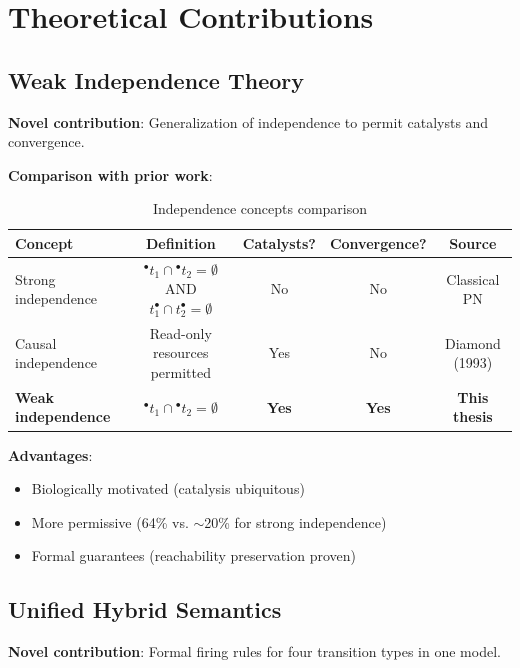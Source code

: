 \section{Theoretical Contributions}
\label{sec:theory-contrib}

\subsection{Weak Independence Theory}
\label{subsec:weak-indep-theory}

\textbf{Novel contribution}: Generalization of independence to permit catalysts and convergence.

\textbf{Comparison with prior work}:

\begin{table}[h]
\centering
\begin{tabular}{@{}lcccc@{}}
\toprule
\textbf{Concept} & \textbf{Definition} & \textbf{Catalysts?} & \textbf{Convergence?} & \textbf{Source} \\
\midrule
Strong independence & ${}^\bullet t_1 \cap {}^\bullet t_2 = \emptyset$ AND $t_1^\bullet \cap t_2^\bullet = \emptyset$ & No & No & Classical PN \\
Causal independence & Read-only resources permitted & Yes & No & Diamond (1993) \\
\textbf{Weak independence} & ${}^\bullet t_1 \cap {}^\bullet t_2 = \emptyset$ & \textbf{Yes} & \textbf{Yes} & \textbf{This thesis} \\
\bottomrule
\end{tabular}
\caption{Independence concepts comparison}
\label{tab:independence-comparison}
\end{table}

\textbf{Advantages}:
\begin{itemize}
    \item Biologically motivated (catalysis ubiquitous)
    \item More permissive (64\% vs. $\sim$20\% for strong independence)
    \item Formal guarantees (reachability preservation proven)
\end{itemize}

\subsection{Unified Hybrid Semantics}
\label{subsec:unified-hybrid}

\textbf{Novel contribution}: Formal firing rules for four transition types in one model.

